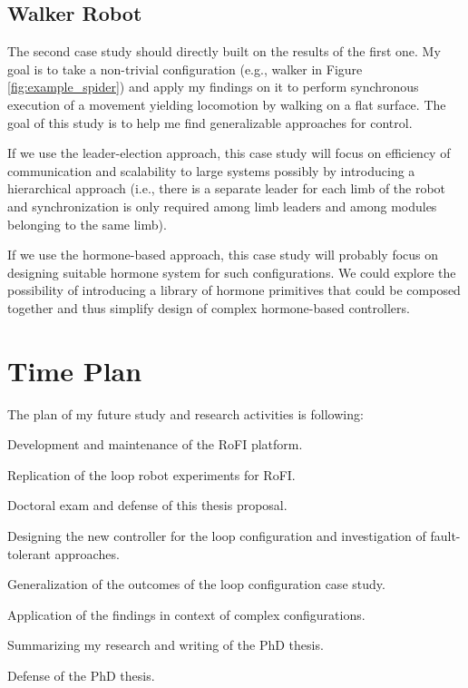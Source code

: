 \subsection{Walker Robot}

The second case study should directly built on the results of the first one. My
goal is to take a non-trivial configuration (e.g., walker in Figure
\ref{fig:example_spider}) and apply my findings on it to perform synchronous
execution of a movement yielding locomotion by walking on a flat surface. The
goal of this study is to help me find generalizable approaches for control.

If we use the leader-election approach, this case study will focus on efficiency
of communication and scalability to large systems possibly by introducing a
hierarchical approach (i.e., there is a separate leader for each limb of the
robot and synchronization is only required among limb leaders and among modules
belonging to the same limb).

If we use the hormone-based approach, this case study will probably focus on
designing suitable hormone system for such configurations. We could explore the
possibility of introducing a library of hormone primitives that could be
composed together and thus simplify design of complex hormone-based controllers.

\section{Time Plan}

The plan of my future study and research activities is following:

\begin{description}[style=nextline,leftmargin=0.8cm]
    \item [now -- January 2023]
        Development and maintenance of the RoFI platform.
    \item [now -- January 2021]
        Replication of the loop robot experiments for RoFI.
    \item [January 2021]
        Doctoral exam and defense of this thesis proposal.
    \item [February 2021 -- June 2021]
        Designing the new controller for the loop configuration and
        investigation of fault-tolerant approaches.
    \item [June 2021 -- December 2022]
        Generalization of the outcomes of the loop configuration case study.
    \item[January 2022 -- August 2022]
        Application of the findings in context of complex configurations.
    \item[September 2022 -- January 2023]
        Summarizing my research and writing of the PhD thesis.
    \item[January 2023]
        Defense of the PhD thesis.
\end{description}
